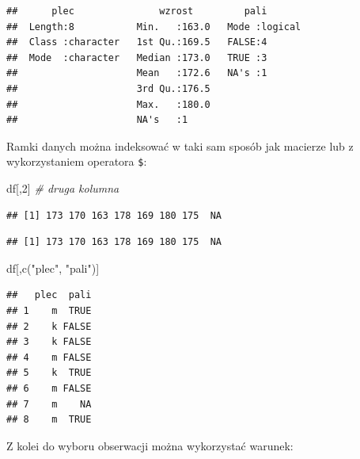 \documentclass[
]{book}
\newenvironment{Shaded}{\begin{snugshade}}{\end{snugshade}}
\newcommand{\CommentTok}[1]{\textcolor[rgb]{0.56,0.35,0.01}{\textit{#1}}}
\newcommand{\DecValTok}[1]{\textcolor[rgb]{0.00,0.00,0.81}{#1}}
\newcommand{\FunctionTok}[1]{\textcolor[rgb]{0.00,0.00,0.00}{#1}}
\newcommand{\NormalTok}[1]{#1}
\newcommand{\SpecialCharTok}[1]{\textcolor[rgb]{0.00,0.00,0.00}{#1}}
\newcommand{\StringTok}[1]{\textcolor[rgb]{0.31,0.60,0.02}{#1}}
\begin{document}
\begin{verbatim}
##      plec               wzrost         pali        
##  Length:8           Min.   :163.0   Mode :logical  
##  Class :character   1st Qu.:169.5   FALSE:4        
##  Mode  :character   Median :173.0   TRUE :3        
##                     Mean   :172.6   NA's :1        
##                     3rd Qu.:176.5                  
##                     Max.   :180.0                  
##                     NA's   :1
\end{verbatim}

Ramki danych można indeksować w taki sam sposób jak macierze lub z wykorzystaniem operatora \texttt{\$}:

\begin{Shaded}
\begin{Highlighting}[]
\NormalTok{df[,}\DecValTok{2}\NormalTok{] }\CommentTok{\# druga kolumna}
\end{Highlighting}
\end{Shaded}

\begin{verbatim}
## [1] 173 170 163 178 169 180 175  NA
\end{verbatim}

\begin{Shaded}
\end{Shaded}

\begin{verbatim}
## [1] 173 170 163 178 169 180 175  NA
\end{verbatim}

\begin{Shaded}
\begin{Highlighting}[]
\NormalTok{df[,}\FunctionTok{c}\NormalTok{(}\StringTok{"plec"}\NormalTok{, }\StringTok{"pali"}\NormalTok{)]}
\end{Highlighting}
\end{Shaded}

\begin{verbatim}
##   plec  pali
## 1    m  TRUE
## 2    k FALSE
## 3    k FALSE
## 4    m FALSE
## 5    k  TRUE
## 6    m FALSE
## 7    m    NA
## 8    m  TRUE
\end{verbatim}

Z kolei do wyboru obserwacji można wykorzystać warunek:

\begin{Shaded}
\end{Shaded}
\end{document}
